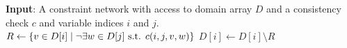\State \textbf{Input}: A constraint network with access to domain array $D$ and a consistency check $c$ and variable indices $i$ and $j$.\\
    \State $R \gets \left\{v \in D[i] \mid \neg\exists w\in D[j] \text{ s.t. } c(i,j,v,w)\right\}$
        \State $D[i] \gets D[i] \setminus R$
        \State {}
    \EndIf
    \State {}
\EndFunction